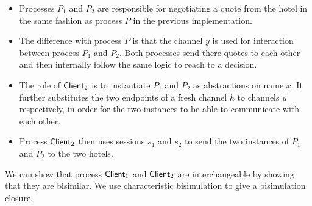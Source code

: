 \begin{itemize}
	\item	Processes $P_1$ and $P_2$ are responsible for negotiating a quote from the
		hotel in the same fashion as process $P$ in the previous implementation.

	\item	The difference with process $P$ is that the channel $y$ is used for
		interaction between process $P_1$ and $P_2$. Both processes send
		there quotes to each other and then internally follow the same
		logic to reach to a decision.

	\item	The role of $\mathsf{Client}_2$ is to instantiate $P_1$ and $P_2$ as abstractions
		on name $x$. It further substitutes
		the two endpoints of a fresh channel $h$ to channels $y$ respectively,
		in order for the two instances to be able to communicate with each other.

	\item	Process $\mathsf{Client}_2$ then uses sessions $s_1$ and $s_2$ to send the two
		instances of $P_1$ and $P_2$ to the two hotels.
\end{itemize}

We can show that process $\mathsf{Client}_1$ and $\mathsf{Client}_2$
are interchangeable by showing that they are bisimilar.
We use characteristic bisimulation to give a bisimulation
closure.
%

